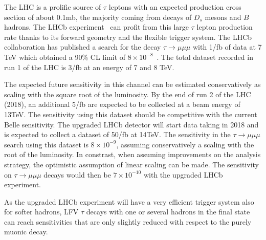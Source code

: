 
The LHC is a prolific source of $\tau$ leptons with an expected
production cross section of about 0.1mb, the majority coming from 
decays of $D_s$ mesons and $B$ hadrons.  
The LHCb experiment~\cite{Alves:2008zz} can profit from this large $\tau$ lepton
production rate thanks to its forward geometry and the flexible
trigger system. The LHCb collaboration has published a search for the
decay $\tau \to \mu\mu\mu$ with 1/fb of data at 7 TeV which  obtained a 90\% CL
limit of $8 \times 10^{-8}$~\cite{Aaij:2013fia}. The total dataset recorded in run 1 of the
LHC is 3/fb at an energy of 7 and 8 TeV.

The expected future sensitivity in this channel can be estimated
conservatively as scaling with the square root of the luminosity. By the end
of run 2 of the LHC (2018), an additional 5/fb are expected to be
collected at a beam energy of 13TeV. The sensitivity using this
dataset should be competitive with the current Belle sensitivity. 
The upgraded LHCb detector will start data taking in 2018 and is
expected to collect a dataset of 50/fb at 14TeV.
The sensitivity in the $\tau \to \mu\mu\mu$ search using this dataset is $8\times
10^{-9}$, assuming conservatively a scaling with the root of the
luminosity. In constrast, when assuming improvements on the analysis
strategy, the optimistic assumption of linear scaling can be made. The
sensitivity on $\tau \to \mu\mu\mu$ decays would then be $7 \times 10^{-10}$ with the
upgraded LHCb experiment. 

As the upgraded LHCb experiment will have a very efficient trigger
system also for softer hadrons, LFV $\tau$ decays with one or several
hadrons in the final state can reach sensitivities that are only slightly reduced
with respect to the purely muonic decay. 


